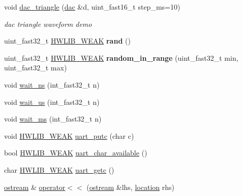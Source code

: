 \begin{DoxyCompactItemize}
void \hyperlink{namespacehwlib_a25454b1b1a7ef5887e55704c3b2fe5b0}{dac\+\_\+triangle} (\hyperlink{classhwlib_1_1dac}{dac} \&d, uint\+\_\+fast16\+\_\+t step\+\_\+ms=10)
\begin{DoxyCompactList}\small\item\em dac triangle waveform demo \end{DoxyCompactList}\item 
\mbox{\label{namespacehwlib_a9ff128f3303adb4ba4fa85e635580e8f}} 
uint\+\_\+fast32\+\_\+t \hyperlink{hwlib-defines_8hpp_a04be4340016df60d6636c1d1c6d94fc9}{H\+W\+L\+I\+B\+\_\+\+W\+E\+AK} {\bfseries rand} ()
\item 
\mbox{\label{namespacehwlib_a37528723e1654b712db0349d6d3367a7}} 
uint\+\_\+fast32\+\_\+t \hyperlink{hwlib-defines_8hpp_a04be4340016df60d6636c1d1c6d94fc9}{H\+W\+L\+I\+B\+\_\+\+W\+E\+AK} {\bfseries random\+\_\+in\+\_\+range} (uint\+\_\+fast32\+\_\+t min, uint\+\_\+fast32\+\_\+t max)
\item 
void \hyperlink{namespacehwlib_a9c01a1d0319f5eadd8926e66aea19aa0}{wait\+\_\+ns} (int\+\_\+fast32\+\_\+t n)
\item 
void \hyperlink{namespacehwlib_a0096b739fc566c896366ecbd3113cc1e}{wait\+\_\+us} (int\+\_\+fast32\+\_\+t n)
\item 
void \hyperlink{namespacehwlib_a6119aa5d3034176aa1515ef4bb193044}{wait\+\_\+ms} (int\+\_\+fast32\+\_\+t n)
\item 
void \hyperlink{hwlib-defines_8hpp_a04be4340016df60d6636c1d1c6d94fc9}{H\+W\+L\+I\+B\+\_\+\+W\+E\+AK} \hyperlink{namespacehwlib_ae568ebef4b8d8a77cecae8cea595896f}{uart\+\_\+putc} (char c)
\item 
bool \hyperlink{hwlib-defines_8hpp_a04be4340016df60d6636c1d1c6d94fc9}{H\+W\+L\+I\+B\+\_\+\+W\+E\+AK} \hyperlink{namespacehwlib_aaf31868f62815d2e405ad90469ae50a5}{uart\+\_\+char\+\_\+available} ()
\item 
char \hyperlink{hwlib-defines_8hpp_a04be4340016df60d6636c1d1c6d94fc9}{H\+W\+L\+I\+B\+\_\+\+W\+E\+AK} \hyperlink{namespacehwlib_aa5ee60a7ff11cc49aba41f8be7f08a67}{uart\+\_\+getc} ()
\item 
\mbox{\label{namespacehwlib_a72b3cd9bbd35ce5a8495b33af557d4ca}} 
\hyperlink{classhwlib_1_1ostream}{ostream} \& \hyperlink{namespacehwlib_a72b3cd9bbd35ce5a8495b33af557d4ca}{operator$<$$<$} (\hyperlink{classhwlib_1_1ostream}{ostream} \&lhs, \hyperlink{classhwlib_1_1location}{location} rhs)

\end{DoxyCompactItemize}
